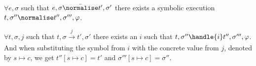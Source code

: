\begin{lemma}
  \label{lem:completeNormalise}
  $\forall e,\sigma$ such that $e,\sigma \bar{\normalise}t',\sigma'$
  there exists a symbolic execution $t,\sigma''\normalise t'',\sigma''',\phi$.
\end{lemma}


\begin{lemma}
  \label{lem:completeHandle}
  $\forall t,\sigma,j$ such that $t,\sigma \xrightarrow[]{j} t',\sigma'$
  there exists an $i$ such that $t,\sigma''\handle{i} t'',\sigma''',\phi$.
  And when substituting the symbol from $i$ with the concrete value from $j$,
  denoted by $s\mapsto c$, we get $t''[s\mapsto c]= t'$ and $\sigma'''[s\mapsto c]=\sigma''$.
\end{lemma}
